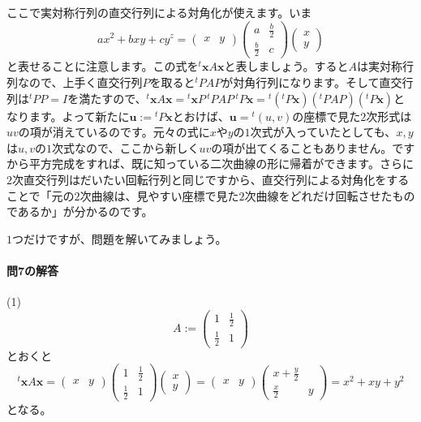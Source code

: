ここで実対称行列の直交行列による対角化が使えます。いま
\[
ax^2 + bxy + cy^z
=
\begin{pmatrix}
x & y
\end{pmatrix}
\begin{pmatrix}
a & \frac{b}{2} \\
\frac{b}{2} & c
\end{pmatrix}
\begin{pmatrix}
x \\
y
\end{pmatrix}
\]
と表せることに注意します。この式を${}^t\bm{x} A \bm{x}$と表しましょう。すると$A$は実対称行列なので、上手く直交行列$P$を取ると${}^tP A P$が対角行列になります。そして直交行列は${}^tP P = I$を満たすので、${}^t\bm{x} A \bm{x} = {}^t\bm{x} P\, {}^tP A P\, {}^t P \bm{x} =  {}^t({}^tP\bm{x}) ({}^tP A P) ({}^tP\bm{x})$となります。よって新たに$\bm{u} := {}^tP \bm{x}$とおけば、$\bm{u} = {}^t(u, v)$の座標で見た$2$次形式は$uv$の項が消えているのです。元々の式に$x$や$y$の$1$次式が入っていたとしても、$x, y$は$u, v$の$1$次式なので、ここから新しく$uv$の項が出てくることもありません。ですから平方完成をすれば、既に知っている二次曲線の形に帰着ができます。さらに$2$次直交行列はだいたい回転行列と同じですから、直交行列による対角化をすることで「元の$2$次曲線は、見やすい座標で見た$2$次曲線をどれだけ回転させたものであるか」が分かるのです。

$1$つだけですが、問題を解いてみましょう。

\paragraph{問7の解答}
(1)
\[
A :=
\begin{pmatrix}
1 & \frac{1}{2} \\
\frac{1}{2} & 1
\end{pmatrix}
\]
とおくと
\[
{}^t\bm{x} A \bm{x}
=
\begin{pmatrix}
x & y
\end{pmatrix}
\begin{pmatrix}
1 & \frac{1}{2} \\
\frac{1}{2} & 1
\end{pmatrix}
\begin{pmatrix}
x \\
y
\end{pmatrix}
=
\begin{pmatrix}
x & y
\end{pmatrix}
\begin{pmatrix}
x + \frac{y}{2} \\
\frac{x}{2} & y
\end{pmatrix}
= x^2 + xy + y^2
\]
となる。

